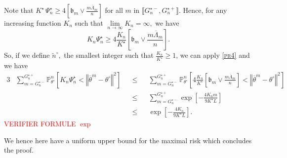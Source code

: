 Note that $K^{\star} \, \Psi_{n}^{\star} \geq 4 \left[\mathfrak{b}_{m} \vee \frac{m \overline{\Lambda}_{m}}{n}\right]$ for all $m$ in $\llbracket G_{n}^{\star-}, G_{n}^{\star+} \rrbracket$.
Hence, for any increasing function $K_{n}$ such that $\lim\limits_{n \rightarrow \infty} K_{n} = \infty,$ we have
\[K_{n} \Psi_{n}^{\star} \geq 4 \frac{K_{n}}{K^{\star}} \left[\mathfrak{b}_{m} \vee \frac{m \overline{\Lambda}_{m}}{n}\right].\]
So, if we define $\tilde{n}^{\circ},$ the smallest integer such that $\frac{K_{n}}{K^{\star}} \geq 1$, we can apply \textsc{\cref{pr4}} and we have
\begin{alignat*}{3}
& \sum\limits_{m = G_{n}^{\star-}}^{G_{n}^{\star+}} \mathds{P}_{\theta^{\circ}}^{n}\left[K_{n} \Psi_{n}^{\star} < \left\Vert \overline{\theta}^{m} - \theta^{\circ} \right\Vert^{2}\right] && \leq && \sum\limits_{m = G_{n}^{\star-}}^{G_{n}^{\star+}} \mathds{P}_{\theta^{\circ}}^{n}\left[4 \frac{K_{n}}{K^{\star}} \left[\mathfrak{b}_{m} \vee \frac{m \overline{\Lambda}_{m}}{n}\right] < \left\Vert \overline{\theta}^{m} - \theta^{\circ} \right\Vert^{2}\right] \\
& && \leq && \sum\limits_{m = G_{n}^{\star-}}^{G_{n}^{\star+}} \exp\left[-\frac{4 K_{n} m}{9 K^{\star} L}\right]\\
& && \leq && \exp\left[-\frac{4 K_{n}}{9 K^{\star} L}\right].
\end{alignat*}
\textcolor{red}{VERIFIER FORMULE $\exp$}

We hence here have a uniform upper bound for the maximal risk which concludes the proof.